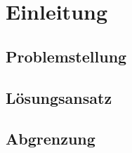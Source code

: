 \section{Einleitung} 
\subsection{Problemstellung}
\subsection{Lösungsansatz}
\subsection{Abgrenzung}
\label{subsec:abgrenzung}
